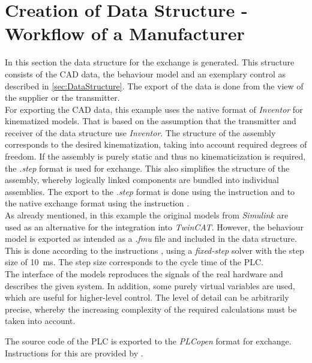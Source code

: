 \section{Creation of Data Structure - Workflow of a Manufacturer}	
    In this section the data structure for the exchange is generated. This structure consists of the CAD data, the behaviour model and an exemplary control as described in \autoref{sec:DataStructure}. The export of the data is done from the view of the supplier or the transmitter. \\
    
    For exporting the CAD data, this example uses the native format of \textit{Inventor} for kinematized models. That is based on the assumption that the transmitter and receiver of the data structure use \textit{Inventor}. The structure of the assembly corresponds to the desired kinematization, taking into account required degrees of freedom. If the assembly is purely static and thus no kinematicization is required, the \textit{.step} format is used for exchange. This also simplifies the structure of the assembly, whereby logically linked components are bundled into individual assemblies. The export to the \textit{.step} format is done using the instruction \cite{InventorAnleitungExportStep} and to the native exchange format using the instruction \cite{InventorAnleitungExportPackAndGo}. \\
    
    As already mentioned, in this example the original models from \textit{Simulink} are used as an alternative for the integration into \textit{TwinCAT}. However, the behaviour model is exported as intended as a \textit{.fmu} file and included in the data structure. This is done according to the instructions \cite{MatlabFmuExport}, using a \textit{fixed-step} solver with the step size of \SI{10}{\milli\second}. The step size corresponds to the cycle time of the PLC. \\
    The interface of the models reproduces the signals of the real hardware and describes the given system. In addition, some purely virtual variables are used, which are useful for higher-level control. The level of detail can be arbitrarily precise, whereby the increasing complexity of the required calculations must be taken into account. 
    
    The source code of the PLC is exported to the \textit{PLCopen} format for exchange. Instructions for this are provided by \cite{TwincatExportPlcopen}.

